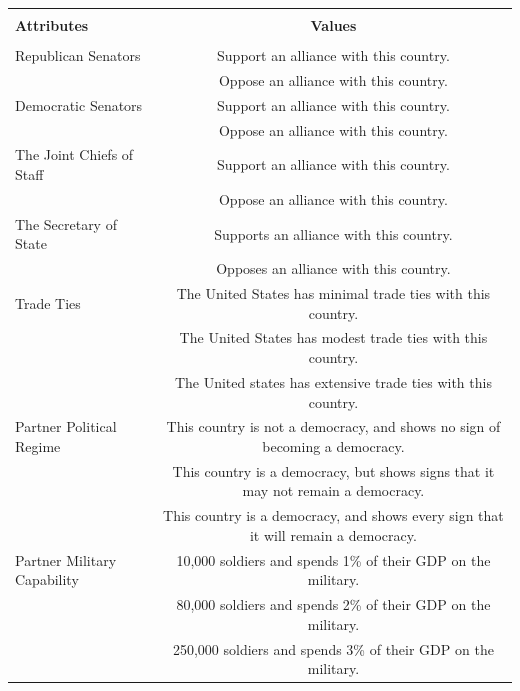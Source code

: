 \documentclass[12pt]{article}
\begin{document}
\begin{table}
\begin{adjustbox}{width = .99\textwidth}
\begin{tabular}{lc} 
\hline \\ 
\textbf{Attributes} & \textbf{Values} \\
\hline \\ 
Republican Senators & Support an alliance with this country. \\
                    & Oppose an alliance with this country. \\ 
                    
Democratic Senators & Support an alliance with this country. \\
                    & Oppose an alliance with this country. \\ 
                    
The Joint Chiefs of Staff & Support an alliance with this country. \\
                    & Oppose an alliance with this country. \\ 
                    
The Secretary of State & Supports an alliance with this country. \\
                    & Opposes an alliance with this country. \\ 
                    
Trade Ties          & The United States has minimal trade ties with this country. \\
                    & The United States has modest trade ties with this country. \\
                    & The United states has extensive trade ties with this country. \\ 
Partner Political Regime    & This country is not a democracy, and shows no sign of becoming a democracy. \\
                    & This country is a democracy, but shows signs that it may not remain a democracy. \\ %
                    & This country is a democracy, and shows every sign that it will remain a democracy. \\
                    
Partner Military Capability & 10,000 soldiers and spends 1\% of their GDP on the military. \\ %
                    & 80,000 soldiers and spends 2\% of their GDP on the military. \\ %
                    & 250,000 soldiers and spends 3\% of their GDP on the military. \\ %
                    

\end{tabular}
\end{adjustbox}
\end{table}
\end{document}
